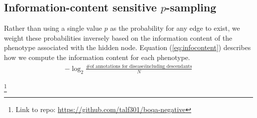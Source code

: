 \subsection{Information-content sensitive $p$-sampling}
Rather than using a single value $p$ as the probability for any edge to exist, we weight these
probabilities inversely based on the information content of the phenotype associated with the hidden node. 
Equation (\ref{eq:infocontent}) describes how we compute the information content for each phenotype.
\begin{align}\label{eq:infocontent}
	-\log_{2}\frac{\text{\# of annotations for disease} i \text{including descendants}}{N}
\end{align}



\footnote{Link to repo:
    \url{https://github.com/talf301/boqa-negative}
}

